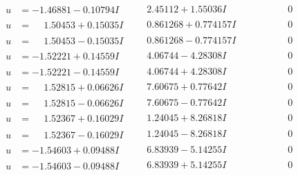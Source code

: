 \documentclass[1p]{elsarticle_modified}
\theoremstyle{definition}
\begin{document}
$$\begin{array}{c|c|c}
\begin{aligned}
u &= -1.46881 - 0.10794 I\end{aligned}
 & \phantom{-}2.45112 + 1.55036 I & \phantom{-0.000000 } 0 \\ \hline\begin{aligned}
u &= \phantom{-}1.50453 + 0.15035 I\end{aligned}
 & \phantom{-}0.861268 + 0.774157 I & \phantom{-0.000000 } 0 \\ \hline\begin{aligned}
u &= \phantom{-}1.50453 - 0.15035 I\end{aligned}
 & \phantom{-}0.861268 - 0.774157 I & \phantom{-0.000000 } 0 \\ \hline\begin{aligned}
u &= -1.52221 + 0.14559 I\end{aligned}
 & \phantom{-}4.06744 - 4.28308 I & \phantom{-0.000000 } 0 \\ \hline\begin{aligned}
u &= -1.52221 - 0.14559 I\end{aligned}
 & \phantom{-}4.06744 + 4.28308 I & \phantom{-0.000000 } 0 \\ \hline\begin{aligned}
u &= \phantom{-}1.52815 + 0.06626 I\end{aligned}
 & \phantom{-}7.60675 + 0.77642 I & \phantom{-0.000000 } 0 \\ \hline\begin{aligned}
u &= \phantom{-}1.52815 - 0.06626 I\end{aligned}
 & \phantom{-}7.60675 - 0.77642 I & \phantom{-0.000000 } 0 \\ \hline\begin{aligned}
u &= \phantom{-}1.52367 + 0.16029 I\end{aligned}
 & \phantom{-}1.24045 + 8.26818 I & \phantom{-0.000000 } 0 \\ \hline\begin{aligned}
u &= \phantom{-}1.52367 - 0.16029 I\end{aligned}
 & \phantom{-}1.24045 - 8.26818 I & \phantom{-0.000000 } 0 \\ \hline\begin{aligned}
u &= -1.54603 + 0.09488 I\end{aligned}
 & \phantom{-}6.83939 - 5.14255 I & \phantom{-0.000000 } 0 \\ \hline\begin{aligned}
u &= -1.54603 - 0.09488 I\end{aligned}
 & \phantom{-}6.83939 + 5.14255 I & \phantom{-0.000000 } 0 \\ \hline\begin{aligned}

\end{aligned}
\end{array}$$
\end{document}
